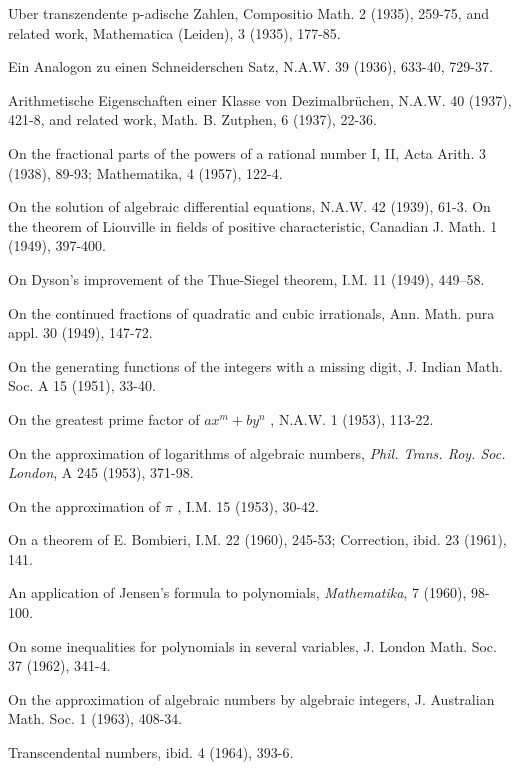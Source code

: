 \begin{hanglist}
    \item Uber transzendente p-adische Zahlen, Compositio Math. 2 (1935), 259-75, and related work, Mathematica (Leiden), 3 (1935), 177-85.
    \item Ein Analogon zu einen Schneiderschen Satz, N.A.W. 39 (1936), 633-40, 729-37.
    \item Arithmetische Eigenschaften einer Klasse von Dezimalbrüchen, N.A.W. 40 (1937), 421-8, and related work, Math. B. Zutphen, 6 (1937), 22-36.
    \item On the fractional parts of the powers of a rational number I, II, Acta Arith. 3 (1938), 89-93; Mathematika, 4 (1957), 122-4.
    \item On the solution of algebraic differential equations, N.A.W. 42 (1939), 61-3. On the theorem of Liouville in fields of positive characteristic, Canadian J. Math. 1 (1949), 397-400.
    \item On Dyson's improvement of the Thue-Siegel theorem, I.M. 11 (1949), 449–58.
    \item On the continued fractions of quadratic and cubic irrationals, Ann. Math. pura appl. 30 (1949), 147-72.
    \item On the generating functions of the integers with a missing digit, J. Indian Math. Soc. A 15 (1951), 33-40.
    \item On the greatest prime factor of  $ax^m + by^n$ , N.A.W. 1 (1953), 113-22.
    \item On the approximation of logarithms of algebraic numbers, \textit{Phil. Trans. Roy. Soc. London}, A 245 (1953), 371-98.
    \item On the approximation of  $\pi$ , I.M. 15 (1953), 30-42.
    \item On a theorem of E. Bombieri, I.M. 22 (1960), 245-53; Correction, ibid. 23 (1961), 141.
    \item An application of Jensen's formula to polynomials, \textit{Mathematika}, 7 (1960), 98-100.
    \item On some inequalities for polynomials in several variables, J. London Math. Soc. 37 (1962), 341-4.
    \item On the approximation of algebraic numbers by algebraic integers, J. Australian Math. Soc. 1 (1963), 408-34.
    \item Transcendental numbers, ibid. 4 (1964), 393-6.

\end{hanglist}
